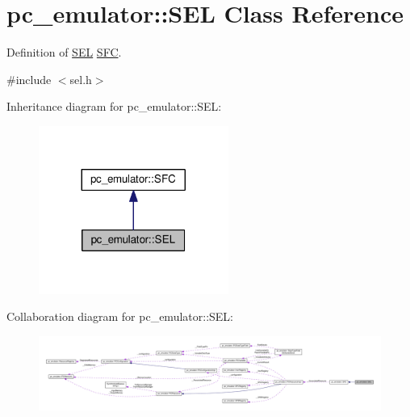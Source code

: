 \hypertarget{classpc__emulator_1_1SEL}{}\section{pc\+\_\+emulator\+:\+:S\+EL Class Reference}
\label{classpc__emulator_1_1SEL}


Definition of \hyperlink{classpc__emulator_1_1SEL}{S\+EL} \hyperlink{classpc__emulator_1_1SFC}{S\+FC}.  




{\ttfamily \#include $<$sel.\+h$>$}



Inheritance diagram for pc\+\_\+emulator\+:\+:S\+EL\+:\nopagebreak
\begin{figure}[H]
\begin{center}
\leavevmode
\includegraphics[width=176pt]{classpc__emulator_1_1SEL__inherit__graph}
\end{center}
\end{figure}


Collaboration diagram for pc\+\_\+emulator\+:\+:S\+EL\+:\nopagebreak
\begin{figure}[H]
\begin{center}
\leavevmode
\includegraphics[width=350pt]{classpc__emulator_1_1SEL__coll__graph}
\end{center}
\end{figure}
